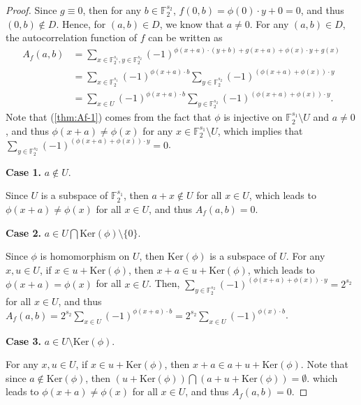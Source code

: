 \documentclass[10pt]{article}
\newcommand{\F}{\mathbb{F}}
\newcommand{\0}{\textbf{0}}
\newcommand{\1}{\textbf{1}}
\begin{document}
{\color{blue}
\begin{proof}
    Since $g\equiv 0$, then for any $b\in \F_2^{s_2}$, $f(0,b)=\phi(0)\cdot y+0=0$, and thus $(0,b)\not\in D$.
    Hence, for $(a,b)\in D$, we know that $a\neq 0$.
    For any $(a,b)\in D$, the autocorrelation function of $f$ can be written as
    \begin{align}
    \nonumber    A_f(a,b)&=\sum_{x\in \F_2^{s_1}, y\in \F_2^{s_2}} (-1)^{\phi(x+a)\cdot (y+b)+g(x+a)+\phi(x)\cdot y+g(x)}\\
    \nonumber            &=\sum_{x\in \F_2^{s_1}} (-1)^{\phi(x+a)\cdot b} \sum_{y\in \F_2^{s_2}} (-1)^{\left(\phi(x+a)+\phi(x)\right)\cdot y}\\
    \label{thm:Af-1}     &=\sum_{x\in U} (-1)^{\phi(x+a)\cdot b}\sum_{y\in \F_2^{s_2}} (-1)^{\left(\phi(x+a)+\phi(x)\right)\cdot y}.
    \end{align}
    Note that (\ref{thm:Af-1})  comes from the fact that $\phi$ is injective on $\F_2^{s_1}\setminus U$ and $a\neq 0$,
    and thus $\phi(x+a)\ne\phi(x)$ for any  $x\in\F_2^{s_1}\setminus U$, which implies that
    $\sum_{y\in \F_2^{s_2}} (-1)^{\left(\phi(x+a)+\phi(x)\right)\cdot y}=0$.

    \textbf{Case 1.} $a\not \in U$.

    Since $U$ is a subspace of $\F_2^{s_1}$, then $a+x\not \in U$ for all $x\in U$,
    which leads to $\phi(x+a)\neq \phi(x)$  for all $x\in U$, and thus $A_f(a,b)=0$.

   \textbf{Case 2.} $a \in U\bigcap \mathrm{Ker}(\phi)\setminus \{0\}$.

    Since $\phi$ is homomorphism on $U$, then $\mathrm{Ker}(\phi)$ is a subspace of $U$.
    For any $x, u\in U$, if $x\in u+\mathrm{Ker}(\phi)$, then $x+a\in u+\mathrm{Ker}(\phi)$,
    which leads to $\phi(x+a)=\phi(x)$  for all $x\in U$.
    Then, $\sum_{y\in \F_2^{s_2}} (-1)^{\left(\phi(x+a)+\phi(x)\right)\cdot y}=2^{s_2}$  for all $x\in U$,
    and thus
        $A_f(a,b)=2^{s_2}\sum_{x\in U} (-1)^{\phi(x+a)\cdot b}=2^{s_2}\sum_{x\in U} (-1)^{\phi(x)\cdot b}$.


    \textbf{Case 3.} $a \in U\setminus \mathrm{Ker}(\phi)$.

    For any $x, u\in U$, if $x\in u+\mathrm{Ker}(\phi)$, then $x+a\in a+u+\mathrm{Ker}(\phi)$.
    Note that since $a\not \in \mathrm{Ker}(\phi)$, then $\left(u+\mathrm{Ker}(\phi)\right)\bigcap\left(a+u+\mathrm{Ker}(\phi)\right)=\emptyset$.
    which leads to $\phi(x+a)\neq \phi(x)$ for all $x\in U$,
    and thus $A_f(a,b)=0$.


\end{proof}}
\end{document}
